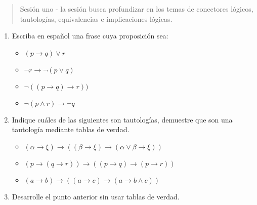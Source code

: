 



\maketitle

\begin{abstract}
Sesión uno - la sesión busca profundizar en los temas de conectores lógicos, tautologías, equivalencias e implicaciones lógicas.
\end{abstract}

\begin{enumerate}

\item Escriba en español una frase cuya proposición sea:

\begin{multicols}{2}

  \begin{itemize}
  \item $(p \rightarrow q) \vee r$
  \item $\neg r \rightarrow \neg(p \vee q)$
  \end{itemize}

\columnbreak

  \begin{itemize}
  \item $\neg ((p \rightarrow q ) \rightarrow r))$
  \item $\neg (p \wedge r ) \rightarrow \neg q $
  \end{itemize}

\end{multicols}

\item Indique cuáles de las siguientes son tautologías, demuestre que son una tautología mediante tablas de verdad.

\begin{itemize}
	\item $(\alpha \rightarrow \xi ) \rightarrow ((\beta \rightarrow \xi) \rightarrow (\alpha \vee \beta \rightarrow \xi )) $
    \item $(p \rightarrow (q \rightarrow r)) \rightarrow ((p \rightarrow q) \rightarrow (p \rightarrow r))$
    \item $(a \rightarrow b ) \rightarrow ((a \rightarrow c ) \rightarrow (a \rightarrow b \wedge c))$
\end{itemize}

\item Desarrolle el punto anterior sin usar tablas de verdad.


\end{enumerate}
